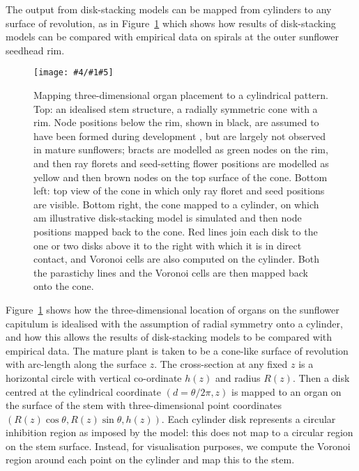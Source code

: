\documentclass[a4paper,10pt]{amsart}
\newlength{\jfigwidth}
\newcommand{\pdffig}[3]{\jdofig{#1}{#2}{#3}{Figures}{.pdf}}
\newcommand{\jdofig}[5]{
	\begin{figure}\centering\texttt{[image: \#4/\#1\#5]} \caption{#2}\label{fig:#1}\end{figure}
}
\begin{document}
The output from disk-stacking models can be mapped from cylinders to any surface of revolution, as in Figure~\ref{fig:scpConeTransformation} which shows how  results of disk-stacking models can be compared with empirical data on spirals at the outer sunflower seedhead rim. 
%
\pdffig{scpConeTransformation}{Mapping three-dimensional organ placement to a cylindrical pattern. Top: an idealised stem structure, 
	a radially symmetric cone with a rim. Node positions below the rim, shown in black, are assumed to have been formed during development , but are largely not observed in mature sunflowers; bracts are modelled as green nodes on the rim, and then ray florets and seed-setting flower positions are  modelled as yellow and then brown nodes on the top surface of the cone. Bottom left: top view of the cone in which only ray floret and seed positions are visible. Bottom right, the cone mapped to a cylinder, on which am illustrative disk-stacking model is simulated and then node positions mapped back to the cone. 
	Red lines join each disk to the one or two disks above it to the right with which it is in direct contact, and Voronoi cells are also computed on the cylinder. Both the parastichy lines and the Voronoi cells are then mapped back onto the cone.}{1}
%
Figure~\ref{fig:scpConeTransformation} shows how the three-dimensional location of organs on the sunflower capitulum is idealised with the assumption of radial symmetry onto a cylinder, and how this allows the results of disk-stacking models to be compared with empirical data. The mature plant is taken to be a cone-like surface of revolution with arc-length along the surface $z$. The cross-section at any fixed $z$ is a horizontal circle with vertical co-ordinate $h(z)$ and radius $R(z)$.
Then a disk centred at  the cylindrical coordinate $(d=\theta/2\pi,z)$ is mapped to an organ on the surface of the stem with three-dimensional point coordinates $(R(z) \cos\theta,R(z)\sin\theta,h(z))$. Each cylinder disk represents a circular inhibition region as imposed by the model: this does not map to a circular region on the stem surface. Instead, for visualisation purposes, we compute the Voronoi region around each point on the cylinder and map this to the stem.
\end{document}
